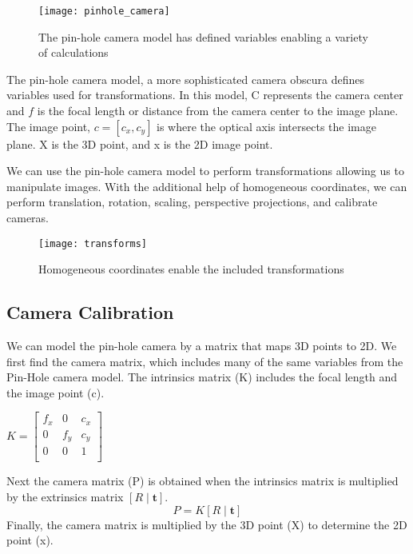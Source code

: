 \documentclass[11pt, twoside, reqno]{book}
\begin{document}
\begin{figure}
	\graphicspath{ {images/} }
	\texttt{[image: pinhole\_camera]}
	\caption{The pin-hole camera model has defined variables enabling a variety of calculations 	\cite{Solem}}

\end{figure}


The pin-hole camera model, a more sophisticated camera obscura defines variables used for transformations. In this model, C represents the camera center and $f$ is the focal length or distance from the camera center to the image plane. The image point, $c = [c_x,c_y]$ is where the optical axis intersects the image plane\cite{Solem}. X is the 3D point, and x is the 2D image point. 




We can use the pin-hole camera model to perform transformations allowing us to manipulate images. With the additional help of homogeneous coordinates, we can perform translation, rotation, scaling, perspective projections, and calibrate cameras. 

\begin{figure}
	\graphicspath{ {images/} }
	
	\texttt{[image: transforms]}
	\label{transforms}
	\caption{Homogeneous coordinates enable the included transformations \cite{sze}}
	
\end{figure}
\FloatBarrier


\subsection{Camera Calibration}
We can model the pin-hole camera by a matrix that maps 3D points to 2D\cite{Solem}. We first find the camera matrix, which  includes many of the same variables from the Pin-Hole camera model. The intrinsics matrix (K) includes the focal length and the image point (c). 
\begin{center}
	
	$K =
	\begin{bmatrix}
	f_x&0&c_x\\
	0&f_y&c_y\\
	0&0&1\\
	\end{bmatrix}$
	
\end{center}

Next the camera matrix (P) is obtained when the intrinsics matrix is multiplied by the extrinsics matrix $[R \mid \textbf{t}]
$. 
\[
P=K[R \mid \textbf{t}]
\]
Finally, the camera matrix is multiplied by the 3D point (X) to determine the 2D 
point (x). 
\end{document}
